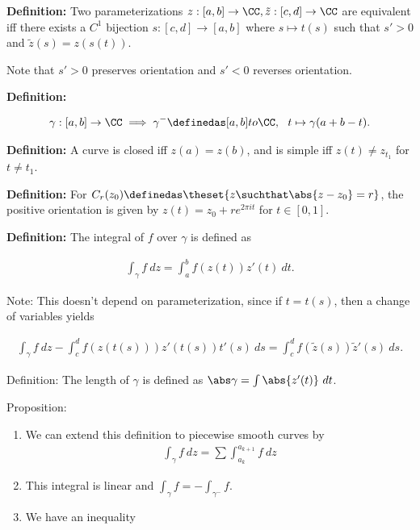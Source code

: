 \textbf{Definition:} Two parameterizations
\(z: [a,b] \to \CC, \tilde z: [c, d] \to \CC\) are equivalent iff there
exists a \(C^1\) bijection \(s: [c, d] \to [a, b]\) where
\(s \mapsto t(s)\) such that \(s'>0\) and \(\tilde z(s) = z(s(t))\).

Note that \(s' > 0\) preserves orientation and \(s'<0\) reverses
orientation.

\textbf{Definition:}

\begin{align*}
\gamma: [a, b] \to \CC \implies \gamma^- \definedas [a,b] to \CC,~~ t \mapsto \gamma(a+b-t)
.\end{align*}

\textbf{Definition:} A curve is closed iff \(z(a) = z(b)\), and is
simple iff \(z(t) \neq z_{t_1}\) for \(t\neq t_1\).

\textbf{Definition:} For
\(C_r(z_0) \definedas \theset{z\suchthat \abs{z-z_0} = r}\), the
positive orientation is given by \(z(t) = z_0 + re^{2\pi i t}\) for
\(t\in [0, 1]\).

\textbf{Definition:} The integral of \(f\) over \(\gamma\) is defined as

\begin{align*}
\int_\gamma f ~dz = \int_a^b f(z(t)) z'(t)~dt
.\end{align*}

Note: This doesn't depend on parameterization, since if \(t = t(s)\),
then a change of variables yields

\begin{align*}
\int_\gamma f ~dz - \int_c^d f(z(t(s)))z'(t(s))t'(s) ~ds = \int_c^d f(\tilde z(s)) \tilde z'(s) ~ds
.\end{align*}

Definition: The length of \(\gamma\) is defined as
\(\abs \gamma = \int \abs{z'(t)} ~dt\).

Proposition:

\begin{enumerate}
\def\labelenumi{\arabic{enumi}.}
\item
  We can extend this definition to piecewise smooth curves by
  \begin{align*}
  \int_\gamma f~dz = \sum \int_{a_k}^{a_{k+1}} f ~dz
  \end{align*}
\item
  This integral is linear and \(\int_\gamma f = -\int_{\gamma^-} f\).
\item
  We have an inequality
\end{enumerate}


